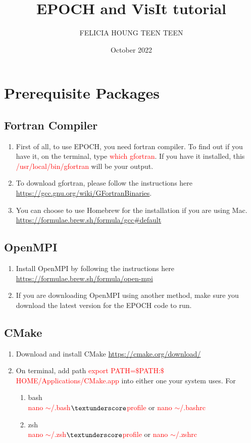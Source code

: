 \documentclass{article}
\title{EPOCH and VisIt tutorial}
\author{FELICIA HOUNG TEEN TEEN}
\date{October 2022}
\begin{document}
\maketitle

\section{Prerequisite Packages}
\subsection{Fortran Compiler}
\begin{enumerate}
    \item First of all, to use EPOCH, you need fortran compiler. To find out if you have it, on the terminal, type \textcolor{red}{which gfortran}. If you have it installed, this \textcolor{red}{/usr/local/bin/gfortran} will be your output.
    \item To download gfortran, please follow the instructions here \url{https://gcc.gnu.org/wiki/GFortranBinaries}.
    \item You can choose to use Homebrew for the installation if you are using Mac.  \url{https://formulae.brew.sh/formula/gcc#default}
\end{enumerate}

\subsection{OpenMPI}
\begin{enumerate}
    \item Install OpenMPI by following the instructions here \url{https://formulae.brew.sh/formula/open-mpi}
    \item If you are downloading OpenMPI using another method, make sure you download the latest version for the EPOCH code to run.
\end{enumerate}

\subsection{CMake}
\begin{enumerate}
\item Download and install CMake \url{https://cmake.org/download/}
\item On terminal, add path \textcolor{red}{export PATH=$\$$PATH:$\$$HOME/Applications/CMake.app} into either one your system uses. For
\begin{enumerate}{}
    \item bash \\
    \textcolor{red}{nano $\sim$/.bash$\textunderscore$profile} or \textcolor{red}{nano $\sim$/.bashrc}
    \item zsh \\
    \textcolor{red}{nano $\sim$/.zsh$\textunderscore$profile} or \textcolor{red}{nano $\sim$/.zshrc}
\end{enumerate}
\end{enumerate}
\end{document}
